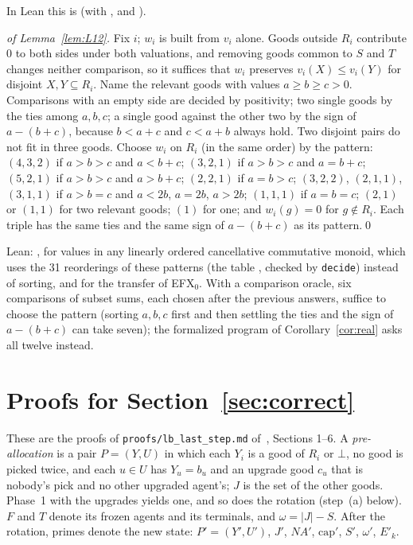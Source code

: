 \documentclass[runningheads,11pt]{llncs}
\newcommand{\efxz}{\texorpdfstring{\mbox{EFX$_0$}}{EFX0}}
\newcommand{\NA}{\mathit{NA}}
\newcommand{\capa}{\mathrm{cap}}
\newcommand{\none}{\bot}
\begin{document}
\noindent In Lean this is  (with ,  and ).

\begin{proof}[of Lemma~\ref{lem:L12}]
Fix $i$; $w_i$ is built from $v_i$ alone. Goods outside $R_i$ contribute $0$ to both sides under both valuations, and removing goods common to $S$ and $T$ changes neither comparison, so it suffices that $w_i$ preserves $v_i(X)\le v_i(Y)$ for disjoint $X,Y\subseteq R_i$. Name the relevant goods with values $a\ge b\ge c>0$. Comparisons with an empty side are decided by positivity; two single goods by the ties among $a,b,c$; a single good against the other two by the sign of $a-(b+c)$, because $b<a+c$ and $c<a+b$ always hold. Two disjoint pairs do not fit in three goods. Choose $w_i$ on $R_i$ (in the same order) by the pattern: $(4,3,2)$ if $a>b>c$ and $a<b+c$; $(3,2,1)$ if $a>b>c$ and $a=b+c$; $(5,2,1)$ if $a>b>c$ and $a>b+c$; $(2,2,1)$ if $a=b>c$; $(3,2,2)$, $(2,1,1)$, $(3,1,1)$ if $a>b=c$ and $a<2b$, $a=2b$, $a>2b$; $(1,1,1)$ if $a=b=c$; $(2,1)$ or $(1,1)$ for two relevant goods; $(1)$ for one; and $w_i(g)=0$ for $g\notin R_i$. Each triple has the same ties and the same sign of $a-(b+c)$ as its pattern.\qed
\end{proof}

\noindent Lean: , for values in any linearly ordered cancellative commutative monoid, which uses the 31 reorderings of these patterns (the table , checked by \texttt{decide}) instead of sorting, and  for the transfer of \efxz{}. With a comparison oracle, six comparisons of subset sums, each chosen after the previous answers, suffice to choose the pattern (sorting $a,b,c$ first and then settling the ties and the sign of $a-(b+c)$ can take seven); the formalized program of Corollary~\ref{cor:real} asks all twelve instead.

\section{Proofs for Section~\ref{sec:correct}}\label{app:proofs}

These are the proofs of \texttt{proofs/lb\_last\_step.md} of~\cite{Repo}, Sections 1--6. A \emph{pre-allocation} is a pair $P=(Y,U)$ in which each $Y_i$ is a good of $R_i$ or $\none$, no good is picked twice, and each $u\in U$ has $Y_u=b_u$ and an upgrade good $c_u$ that is nobody's pick and no other upgraded agent's; $J$ is the set of the other goods. Phase~1 with the upgrades yields one, and so does the rotation (step~(a) below). $F$ and $T$ denote its frozen agents and its terminals, and $\omega=|J|-S$. After the rotation, primes denote the new state: $P'=(Y',U')$, $J'$, $\NA'$, $\capa'$, $S'$, $\omega'$, $E'_{k}$.
\end{document}
